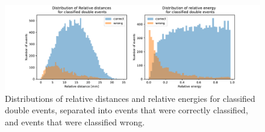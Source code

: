 \documentclass[12pt, notitlepage]{article}
\begin{document}
\begin{figure}
    \includegraphics[width=\textwidth]{figures/DenseNet201_relative_test_compare}
    \caption{Distributions of relative distances and relative energies for classified double events,
    separated into events that were correctly classified, and events that were classified wrong.}
    \label{fig:relative-compare}
\end{figure}
\end{document}
